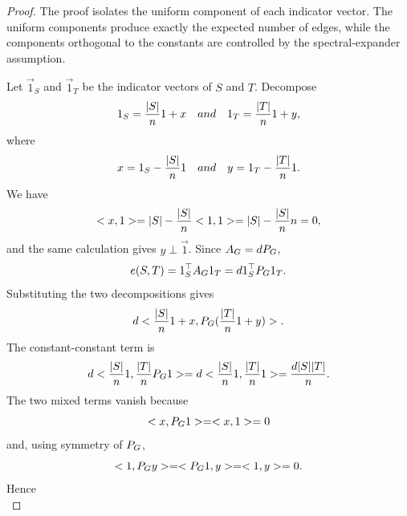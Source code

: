 \begin{proof}
	The proof isolates the uniform component of each indicator vector. The uniform components produce exactly the expected number of edges, while the components orthogonal to the constants are controlled by the spectral-expander assumption.

	Let \(\vec{1}_S\) and \(\vec{1}_T\) be the indicator vectors of \(S\) and \(T\). Decompose
	\begin{equation}
		1_S=\frac{\lvert S\rvert}{n}1+x
		\quad and\quad
		1_T=\frac{\lvert T\rvert}{n}1+y,
	\end{equation}
	where
	\begin{equation}
		x=1_S-\frac{\lvert S\rvert}{n}1
		\quad and\quad
		y=1_T-\frac{\lvert T\rvert}{n}1.
	\end{equation}
	We have
	\begin{equation}
		< x,1>=\lvert S\rvert-\frac{\lvert S\rvert}{n}<1,1>=\lvert S\rvert-\frac{\lvert S\rvert}{n}n=0,
	\end{equation}
	and the same calculation gives \(y\perp\vec{1}\). Since \(A_{G}=dP_{G}\),
	\begin{equation}
		e(S,T)=1_S^{\top}A_{G}1_T=d1_S^{\top}P_{G}1_T.
	\end{equation}
	Substituting the two decompositions gives
	\begin{equation}
		d< \frac{\lvert S\rvert}{n}1+x,P_{G}(\frac{\lvert T\rvert}{n}1+y)>.
	\end{equation}
	The constant-constant term is
	\begin{equation}
		d< \frac{\lvert S\rvert}{n}1,\frac{\lvert T\rvert}{n}P_{G}1>
		=
		d< \frac{\lvert S\rvert}{n}1,\frac{\lvert T\rvert}{n}1>
		=
		\frac{d\lvert S\rvert\lvert T\rvert}{n}.
	\end{equation}
	The two mixed terms vanish because
	\begin{equation}
		< x,P_{G}1>=< x,1>=0
	\end{equation}
	and, using symmetry of \(P_{G}\),
	\begin{equation}
		< 1,P_{G}y>=< P_{G}1,y>=< 1,y>=0.
	\end{equation}
	Hence
	\begin{equation}

\end{equation}
\end{proof}
